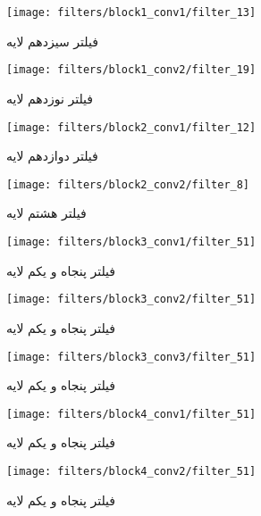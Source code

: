 \documentclass{article}
\begin{document}
\begin{figure}[H]
	\centerline{\texttt{[image: filters/block1\_conv1/filter\_13]}}
	\caption{فیلتر سیزدهم لایه }
\end{figure}

\begin{figure}[H]
	\centerline{\texttt{[image: filters/block1\_conv2/filter\_19]}}
	\caption{فیلتر نوزدهم لایه }
\end{figure}

\begin{figure}[H]
	\centerline{\texttt{[image: filters/block2\_conv1/filter\_12]}}
	\caption{فیلتر دوازدهم لایه }
\end{figure}

\begin{figure}[H]
	\centerline{\texttt{[image: filters/block2\_conv2/filter\_8]}}
	\caption{فیلتر هشتم لایه }
\end{figure}

\begin{figure}[H]
	\centerline{\texttt{[image: filters/block3\_conv1/filter\_51]}}
	\caption{فیلتر پنجاه و یکم لایه }
\end{figure}

\begin{figure}[H]
	\centerline{\texttt{[image: filters/block3\_conv2/filter\_51]}}
	\caption{فیلتر پنجاه و یکم لایه }
\end{figure}


\begin{figure}[H]
	\centerline{\texttt{[image: filters/block3\_conv3/filter\_51]}}
	\caption{فیلتر پنجاه و یکم لایه }
\end{figure}

\begin{figure}[H]
	\centerline{\texttt{[image: filters/block4\_conv1/filter\_51]}}
	\caption{فیلتر پنجاه و یکم لایه }
\end{figure}

\begin{figure}[H]
	\centerline{\texttt{[image: filters/block4\_conv2/filter\_51]}}
	\caption{فیلتر پنجاه و یکم لایه }
\end{figure}
\end{document}
